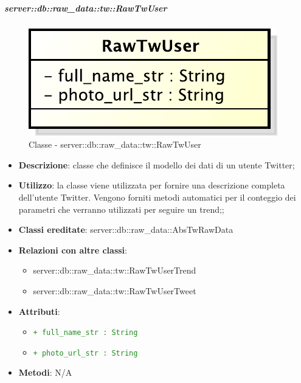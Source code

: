 		\subparagraph{server::db::raw\_data::tw::RawTwUser} %
		\label{subp:server_db_raw_data_tw_rawtwuser}
			\begin{figure}[htbp]
				\centering
				\centerline{\includegraphics[scale=0.75]{./images/server/classes/db/raw_tw_user.pdf}}
				\caption{Classe - server::db::raw\_data::tw::RawTwUser}
			\end{figure}
			\begin{itemize}
				\item \textbf{Descrizione}: classe che definisce il modello dei dati di un utente Twitter;
				\item \textbf{Utilizzo}: la classe viene utilizzata per fornire una descrizione completa dell'utente Twitter. Vengono forniti metodi automatici per il conteggio dei parametri che verranno utilizzati per seguire un trend;;
				\item \textbf{Classi ereditate}: server::db::raw\_data::AbsTwRawData
				\item \textbf{Relazioni con altre classi}:
					\begin{itemize}
						\item server::db::raw\_data::tw::RawTwUserTrend
						\item server::db::raw\_data::tw::RawTwUserTweet
					\end{itemize}
				\item \textbf{Attributi}:
					\begin{itemize}
						\item \textcolor{forestgreen}{\texttt{+ full\_name\_str : String}}
						\item \textcolor{forestgreen}{\texttt{+ photo\_url\_str : String}}
					\end{itemize}
				\item \textbf{Metodi}: N/A
			\end{itemize}


